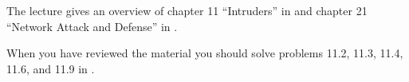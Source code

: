 The lecture gives an overview of chapter 11 ``Intruders'' in 
\cite{Stallings2013nse} and chapter 21 ``Network Attack and Defense'' in 
\cite{Anderson2008sea}.

When you have reviewed the material you should solve problems 11.2, 11.3, 11.4, 
11.6, and 11.9 in \cite{Stallings2013nse}.
